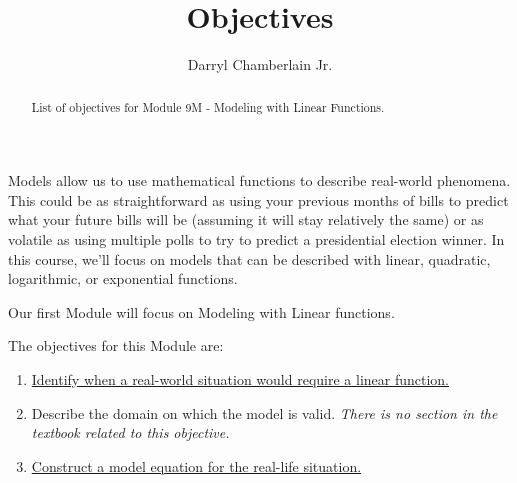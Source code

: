 \documentclass{ximera}
\author{Darryl Chamberlain Jr.}
\title{Objectives}
\begin{document}
\begin{abstract}
List of objectives for Module 9M - Modeling with Linear Functions.
\end{abstract}
\maketitle

Models allow us to use mathematical functions to describe real-world phenomena. This could be as straightforward as using your previous months of bills to predict what your future bills will be (assuming it will stay relatively the same) or as volatile as using multiple polls to try to predict a presidential election winner. In this course, we'll focus on models that can be described with linear, quadratic, logarithmic, or exponential functions. 

Our first Module will focus on Modeling with Linear functions. 

The objectives for this Module are: 
\begin{enumerate}
    \item \href{https://cnx.org/contents/mwjClAV_@8.12:3PeE3KzR@10/Modeling-with-Linear-Functions}{Identify when a real-world situation would require a linear function.}
	\item Describe the domain on which the model is valid. \textit{There is no section in the textbook related to this objective.}
	\item \href{https://cnx.org/contents/mwjClAV_@8.12:6dX4RGdg@12/Fitting-Linear-Models-to-Data}{Construct a model equation for the real-life situation.} 
\end{enumerate}
\end{document}
